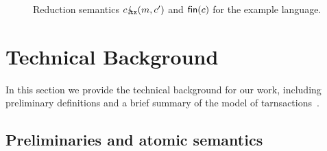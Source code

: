\newcommand\obseq{\stackrel{\sim}{=}}
\newcommand\CS{\{c,\sigma\}}
\newcommand\CpSp{\{c',\sigma'\}}
\newcommand\numCS[1]{\{c_{#1},\sigma_{#1}\}}


\begin{figure}
\caption{Reduction semantics 
$c \lightning_{\mkern-7mu \texttt{tx}} (m,c')$ and $\textsf{fin}(c)$
for the example language.}
\end{figure}

\section{Technical Background}

In this section we provide the technical background for our work,
including preliminary definitions and a brief summary of the \PMPY{}
model of tarnsactions~\cite{KP:PLDI15}.

\subsection{Preliminaries and atomic semantics}

%
%

